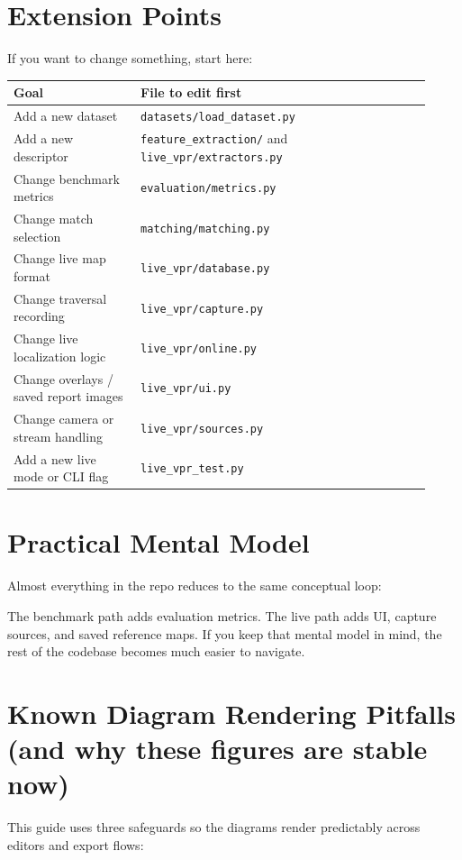 \documentclass[11pt]{article}
\newcommand{\file}[1]{\texttt{#1}}
\begin{document}
\section{Extension Points}
If you want to change something, start here:

\begin{longtable}{p{0.28\linewidth} p{0.64\linewidth}}
\toprule
\textbf{Goal} & \textbf{File to edit first} \\
\midrule
Add a new dataset & \file{datasets/load\_dataset.py} \\
Add a new descriptor & \file{feature\_extraction/} and \file{live\_vpr/extractors.py} \\
Change benchmark metrics & \file{evaluation/metrics.py} \\
Change match selection & \file{matching/matching.py} \\
Change live map format & \file{live\_vpr/database.py} \\
Change traversal recording & \file{live\_vpr/capture.py} \\
Change live localization logic & \file{live\_vpr/online.py} \\
Change overlays / saved report images & \file{live\_vpr/ui.py} \\
Change camera or stream handling & \file{live\_vpr/sources.py} \\
Add a new live mode or CLI flag & \file{live\_vpr\_test.py} \\
\bottomrule
\end{longtable}

\section{Practical Mental Model}
Almost everything in the repo reduces to the same conceptual loop:

\begin{center}
\end{center}

The benchmark path adds evaluation metrics. The live path adds UI, capture sources, and saved reference maps. If you keep that mental model in mind, the rest of the codebase becomes much easier to navigate.

\section{Known Diagram Rendering Pitfalls (and why these figures are stable now)}
This guide uses three safeguards so the diagrams render predictably across editors and export flows:
\end{document}
